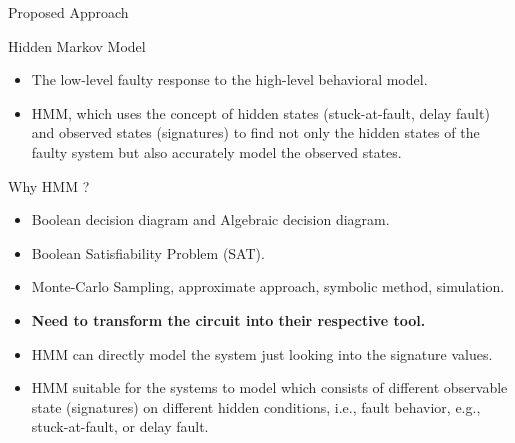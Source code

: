 \documentclass[aspectratio=1610]{beamer}
\begin{document}
\begin{frame}{Proposed Approach}

\vspace{-0.2cm}
\begin{block}{Hidden Markov Model}
\end{block}
\begin{itemize}
\item The low-level faulty response to the high-level behavioral model.
\item HMM, which uses the concept of hidden states (stuck-at-fault, delay fault) and observed states (signatures) to find not only the hidden states of the faulty system but also accurately model the observed states.


\end{itemize}

\begin{block}{Why HMM ?}
\end{block}
\begin{itemize}
\item Boolean decision diagram and Algebraic decision diagram.

\item Boolean Satisfiability Problem (SAT).

\item Monte-Carlo Sampling, approximate approach, symbolic method, simulation.

\item \textbf{Need to transform the circuit into their respective tool.}

\item HMM can directly model the system just looking into the signature values.

\item HMM suitable for the systems to model which consists of different observable state (signatures) on different hidden conditions, i.e., fault behavior, e.g., stuck-at-fault, or delay fault.
\end{itemize}


\end{frame}
\end{document}
